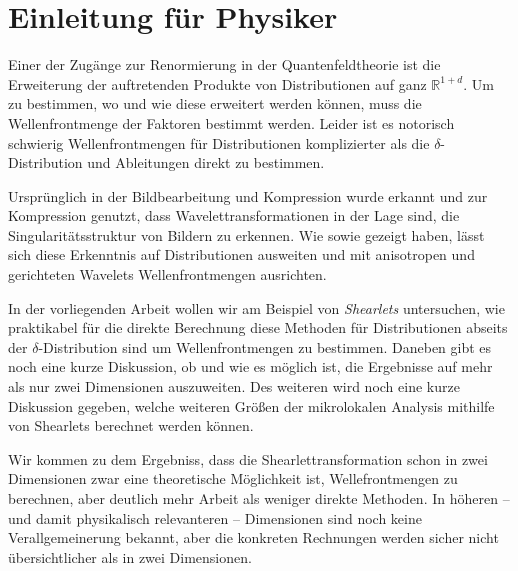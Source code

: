 
\section{Einleitung für Physiker} %
\label{sec:einleitung_physics}

Einer der Zugänge zur Renormierung in der Quantenfeldtheorie ist die Erweiterung der auftretenden Produkte von Distributionen auf ganz $\mathbb{R}^{1+d}$. Um zu bestimmen, wo und wie diese erweitert werden können, muss die Wellenfrontmenge der Faktoren bestimmt werden. Leider ist es notorisch schwierig Wellenfrontmengen für Distributionen komplizierter als die $\delta$-Distribution und Ableitungen direkt zu bestimmen.

Ursprünglich in der Bildbearbeitung und Kompression wurde erkannt und zur Kompression genutzt, dass Wavelettransformationen in der Lage sind, die Singularitätsstruktur von Bildern zu erkennen.
Wie \textcite {Kutyniok2008} sowie \textcite
{Candes2005} gezeigt haben, lässt sich diese Erkenntnis auf Distributionen ausweiten und mit anisotropen und gerichteten Wavelets Wellenfrontmengen ausrichten.

In der vorliegenden Arbeit wollen wir am Beispiel von \emph{Shearlets} untersuchen, wie praktikabel für die direkte Berechnung diese Methoden für Distributionen abseits der $\delta$-Distribution sind um Wellenfrontmengen zu bestimmen. Daneben gibt es noch eine kurze Diskussion, ob und wie es möglich ist, die Ergebnisse auf mehr als nur zwei Dimensionen auszuweiten.
Des weiteren wird noch eine kurze Diskussion gegeben, welche weiteren Größen der mikrolokalen Analysis mithilfe von Shearlets berechnet werden können.

Wir kommen zu dem Ergebniss, dass die Shearlettransformation schon in zwei Dimensionen zwar eine theoretische Möglichkeit ist, Wellefrontmengen zu berechnen, aber deutlich mehr Arbeit als weniger direkte Methoden. In höheren -- und damit physikalisch relevanteren -- Dimensionen sind noch keine Verallgemeinerung bekannt, aber die konkreten Rechnungen werden sicher nicht übersichtlicher als in zwei Dimensionen.


